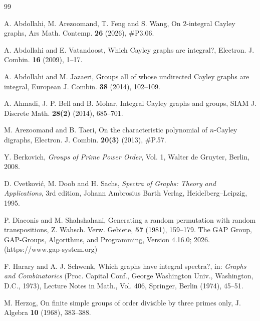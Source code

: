\documentclass{amsart}
\begin{document}
\begin{thebibliography}{99}
	
	A. Abdollahi, M. Arezoomand, T. Feng and S. Wang,
	On $2$-integral Cayley graphs,
	Ars Math. Contemp. \textbf{26} (2026), \#P3.06.
	
	A. Abdollahi and E. Vatandoost,
	Which Cayley graphs are integral?,
	Electron. J. Combin. \textbf{16} (2009), 1--17.
	
	A. Abdollahi and M. Jazaeri,
	Groups all of whose undirected Cayley graphs are integral,
	European J. Combin. \textbf{38} (2014), 102--109.
	
	A. Ahmadi, J. P. Bell and B. Mohar,
	Integral Cayley graphs and groups,
	SIAM J. Discrete Math. \textbf{28(2)} (2014), 685--701.
	
	M. Arezoomand and B. Taeri,
	On the characteristic polynomial of $n$-Cayley digraphs,
	Electron. J. Combin. \textbf{20(3)} (2013), \#P.57.
	
	Y. Berkovich,
	\emph{Groups of Prime Power Order}, Vol. 1,
	Walter de Gruyter, Berlin, 2008.
	
	
	D. Cvetković, M. Doob and H. Sachs,
	\emph{Spectra of Graphs: Theory and Applications},
	3rd edition, Johann Ambrosius Barth Verlag, Heidelberg--Leipzig, 1995.
	
	P. Diaconis and M. Shahshahani, Generating a random permutation with random transpositions, Z. Wahsch. Verw. Gebiete, \textbf{57} (1981), 159--179.
	The GAP Group, GAP-Groups, Algorithms, and Programming, Version 4.16.0; 2026. (https://www.gap-system.org)

	
	F. Harary and A. J. Schwenk,
	Which graphs have integral spectra?,
	in: \emph{Graphs and Combinatorics}
	(Proc. Capital Conf., George Washington Univ., Washington, D.C., 1973),
	Lecture Notes in Math., Vol. 406,
	Springer, Berlin (1974), 45--51.
	
	M. Herzog,
	On finite simple groups of order divisible by three primes only,
	J. Algebra \textbf{10} (1968), 383--388.
	

	
	

\end{thebibliography}
\end{document}
